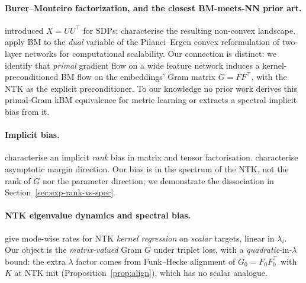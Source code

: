 \documentclass{article}
\begin{document}
\paragraph{Burer--Monteiro factorization, and the closest BM-meets-NN prior art.}
\citet{burer2003nonlinear,burer2005local} introduced $X=UU^\top$ for SDPs;
\citet{boumal2016non,bhojanapalli2016global,ge2016matrix,park2017non}
characterise the resulting non-convex landscape.
\citet{sahiner2022scaling} apply BM to the \emph{dual} variable of the
Pilanci--Ergen convex reformulation of two-layer networks for
computational scalability. Our connection is distinct: we identify that
\emph{primal} gradient flow on a wide feature network induces a
kernel-preconditioned BM flow on the embeddings' Gram matrix
$G = FF^\top$, with the NTK as the explicit preconditioner. To our
knowledge no prior work derives this primal-Gram kBM equivalence for
metric learning or extracts a spectral implicit bias from it.

\paragraph{Implicit bias.}
\citet{gunasekar2017implicit,arora2019implicit,razin2020implicit}
characterise an implicit \emph{rank} bias in matrix and tensor
factorisation. \citet{soudry2018implicit,lyu2019gradient} characterise
asymptotic margin direction. Our bias is in the spectrum of the NTK,
not the rank of $G$ nor the parameter direction; we demonstrate the
dissociation in Section~\ref{sec:exp-rank-vs-spec}.

\paragraph{NTK eigenvalue dynamics and spectral bias.}
\citet{bordelon2020spectrum,canatar2021spectral,basri2020frequency}
give mode-wise rates for NTK \emph{kernel regression} on
\emph{scalar} targets, linear in $\lambda_i$. Our object is the
\emph{matrix-valued} Gram $G$ under triplet loss, with a
\emph{quadratic}-in-$\lambda$ bound: the extra $\lambda$ factor comes
from Funk--Hecke alignment of $G_0 = F_0 F_0^\top$ with $K$ at NTK
init (Proposition~\ref{prop:align}), which has no scalar analogue.
\end{document}
